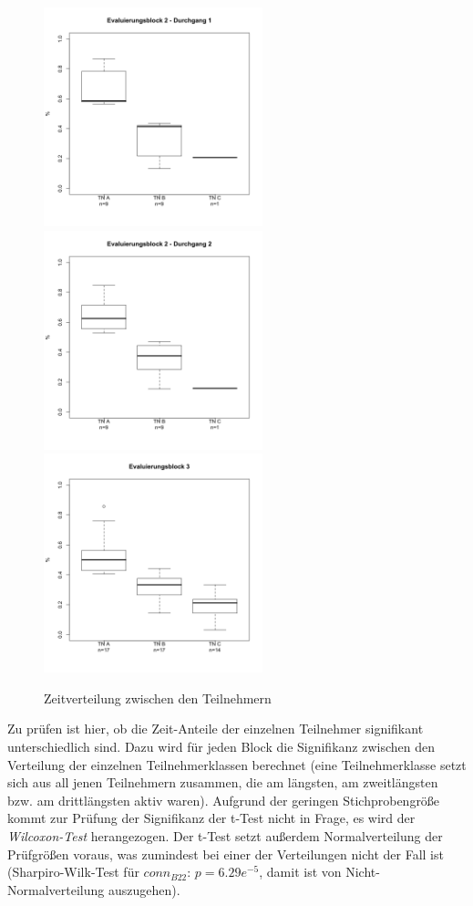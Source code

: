 \begin{figure}[htbp]
	\centering
		\includegraphics[height=2.5in]{img/Evaluierung/timeDistSE1.png}
		\includegraphics[height=2.5in]{img/Evaluierung/timeDistSE2.png}
		\includegraphics[height=2.5in]{img/Evaluierung/timeDistUE.png}
	\caption{Zeitverteilung zwischen den Teilnehmern}
	\label{fig:img_Evaluierung_timeDist}
\end{figure}

Zu prüfen ist hier, ob die Zeit-Anteile der einzelnen Teilnehmer signifikant unterschiedlich sind. Dazu wird für jeden Block die Signifikanz zwischen den Verteilung der einzelnen Teilnehmerklassen berechnet (eine Teilnehmerklasse setzt sich aus all jenen Teilnehmern zusammen, die am längsten, am zweitlängsten bzw. am drittlängsten aktiv waren).  Aufgrund der geringen Stichprobengröße kommt zur Prüfung der Signifikanz der t-Test nicht in Frage, es wird der \emph{Wilcoxon-Test} herangezogen. Der t-Test setzt außerdem Normalverteilung der Prüfgrößen voraus, was zumindest bei einer der Verteilungen nicht der Fall ist (Sharpiro-Wilk-Test für $conn_{B22}$: $p=6.29e^{-5}$, damit ist von Nicht-Normalverteilung auszugehen).

